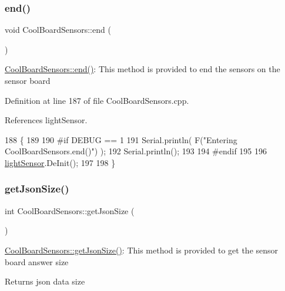 \mbox{\label{classCoolBoardSensors_a4902b69f6e628bd6557193758fdd2bae}} 
\subsubsection{\texorpdfstring{end()}{end()}}
{\footnotesize\ttfamily void Cool\+Board\+Sensors\+::end (\begin{DoxyParamCaption}{ }\end{DoxyParamCaption})}

\hyperlink{classCoolBoardSensors_a4902b69f6e628bd6557193758fdd2bae}{Cool\+Board\+Sensors\+::end()}\+: This method is provided to end the sensors on the sensor board 

Definition at line 187 of file Cool\+Board\+Sensors.\+cpp.



References light\+Sensor.


\begin{DoxyCode}
188 \{
189 
190 \textcolor{preprocessor}{#if DEBUG == 1  }
191     Serial.println( F(\textcolor{stringliteral}{"Entering CoolBoardSensors.end()"}) );
192     Serial.println();
193 
194 \textcolor{preprocessor}{#endif}
195 
196     \hyperlink{classCoolBoardSensors_a3e397300fb707dd193e909a757bf6102}{lightSensor}.DeInit();
197 
198 \}
\end{DoxyCode}
\mbox{\label{classCoolBoardSensors_ab82c2a1633768ccd12a589320fa31a14}} 
\subsubsection{\texorpdfstring{get\+Json\+Size()}{getJsonSize()}}
{\footnotesize\ttfamily int Cool\+Board\+Sensors\+::get\+Json\+Size (\begin{DoxyParamCaption}{ }\end{DoxyParamCaption})}

\hyperlink{classCoolBoardSensors_ab82c2a1633768ccd12a589320fa31a14}{Cool\+Board\+Sensors\+::get\+Json\+Size()}\+: This method is provided to get the sensor board answer size

\begin{DoxyReturn}{Returns}
json data size 
\end{DoxyReturn}


